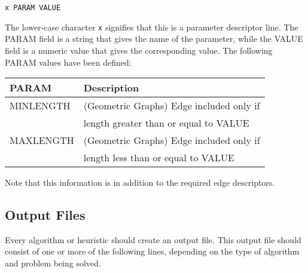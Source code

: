 \begin{itemize}
\begin{itemize}
\begin{verbatim}
x PARAM VALUE
\end{verbatim} 
The lower-case character {\tt x} signifies that this is a parameter
descriptor line.  The PARAM field is a string that gives the name of
the parameter, while the VALUE field is a numeric value that gives the
corresponding value.  The following PARAM values have been defined:

\begin{tabular}{ll}\hline
PARAM&Description\\\hline
MINLENGTH&(Geometric Graphs) Edge included only if \\
&length greater than or equal to VALUE\\
MAXLENGTH&(Geometric Graphs) Edge included only if \\
&length less than or equal to VALUE\\\hline
\end{tabular}

Note that this information is in addition to the required edge
descriptors.

\end{itemize}
\end{itemize}

\subsection{Output Files}
Every algorithm or heuristic should create an output file.  This
output file should consist of one or more of the following lines,
depending on the type of algorithm and problem being solved.

